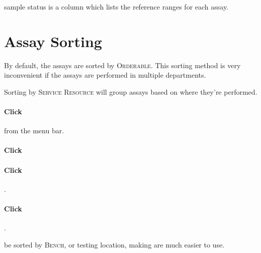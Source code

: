  sample status is a column which lists the reference ranges for each assay.\\



\section{Assay Sorting}
By default, the assays are sorted by \textsc{Orderable}. This sorting method is very inconvenient if the assays are performed in multiple departments.

Sorting by \textsc{Service Resource} will group assays based on where they're performed.

\paragraph{Click}  from the menu bar.\\


\paragraph{Click} 

\paragraph{Click} .

\paragraph{Click} .\\


 be sorted by \textsc{Bench}, or testing location, making \gls{are} much easier to use.



